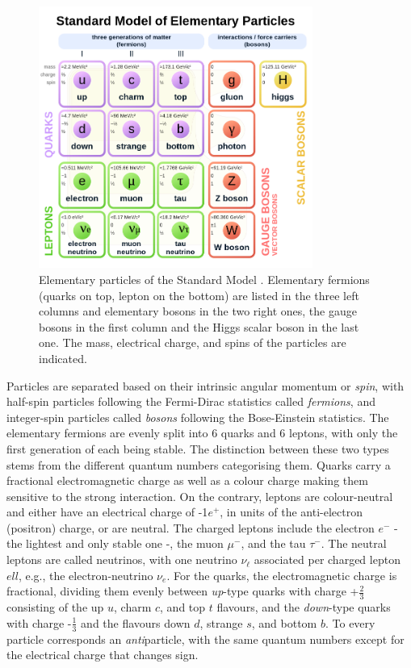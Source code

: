 \begin{figure}[!h]
    \centering
    \includegraphics[width=0.8\textwidth]{Images/Theory/particlesSM.png} %
    \caption[Particles in the SM]{Elementary particles of the Standard Model \cite{tableSMWiki}. Elementary fermions (quarks on top, lepton on the bottom) are listed in the three left columns and elementary bosons in the two right ones, the gauge bosons in the first column and the Higgs scalar boson in the last one. The mass, electrical charge, and spins of the particles are indicated.}
    \label{particlesSM}
\end{figure}

Particles are separated based on their intrinsic angular momentum or \textit{spin}, with half-spin particles following the Fermi-Dirac statistics called \textit{fermions}, and integer-spin particles called \textit{bosons} following the Bose-Einstein statistics. The elementary fermions are evenly split into 6 quarks and 6 leptons, with only the first generation of each being stable. The distinction between these two types stems from the different quantum numbers categorising them. Quarks carry a fractional electromagnetic charge as well as a colour charge making them sensitive to the strong interaction. On the contrary, leptons are colour-neutral and either have an electrical charge of -1$e^+$, in units of the anti-electron (positron) charge, or are neutral. The charged leptons include the electron $e^-$ - the lightest and only stable one -, the muon $\mu^-$, and the tau $\tau^-$. The neutral leptons are called neutrinos, with one neutrino $\nu_\ell$ associated per charged lepton $ell$, e.g., the electron-neutrino $\nu_e$. For the quarks, the electromagnetic charge is fractional, dividing them evenly between \textit{up}-type quarks with charge +$\frac{2}{3}$ consisting of the up $u$, charm $c$, and top $t$ flavours, and the \textit{down}-type quarks with charge -$\frac{1}{3}$ and the flavours down $d$, strange $s$, and bottom $b$. To every particle corresponds an \textit{anti}particle, with the same quantum numbers except for the electrical charge that changes sign. \\

